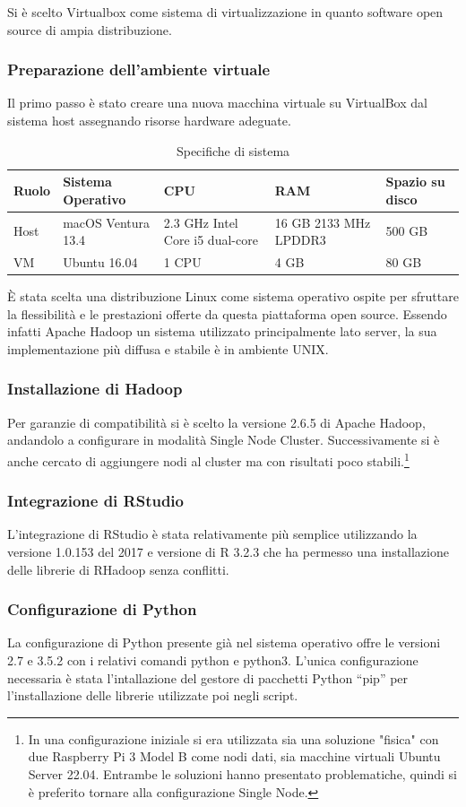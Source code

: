 Si è scelto Virtualbox come sistema di virtualizzazione in quanto software open source di ampia distribuzione.
\subsubsection{Preparazione dell'ambiente virtuale}
Il primo passo è stato creare una nuova macchina virtuale su VirtualBox dal sistema host assegnando risorse hardware adeguate.
\begin{table}[ht]
\centering
\begin{tabularx}{\textwidth}{|X|X|X|X|X|}
\hline
Ruolo & Sistema Operativo & CPU & RAM & Spazio su disco \\
\hline
Host & macOS Ventura 13.4 & 2.3 GHz Intel Core i5 dual-core & 16 GB 2133 MHz LPDDR3 & 500 GB \\
\hline
VM & Ubuntu 16.04 & 1 CPU & 4 GB & 80 GB \\
\hline
\end{tabularx}
\caption{Specifiche di sistema}
\label{tab:specifiche}
\end{table}
    
È stata scelta una distribuzione Linux come sistema operativo ospite per sfruttare la flessibilità e le prestazioni offerte da questa piattaforma open source. Essendo infatti Apache Hadoop un sistema utilizzato principalmente lato server, la sua implementazione più diffusa e stabile è in ambiente UNIX.
\subsubsection{Installazione di Hadoop}
Per garanzie di compatibilità si è scelto la versione 2.6.5 di Apache Hadoop, andandolo a configurare in modalità Single Node Cluster. Successivamente si è anche cercato di aggiungere nodi al cluster ma con risultati poco stabili.\footnote{In una configurazione iniziale si era utilizzata sia una soluzione "fisica" con due Raspberry Pi 3 Model B come nodi dati, sia macchine virtuali Ubuntu Server 22.04. Entrambe le soluzioni hanno presentato problematiche, quindi si è preferito tornare alla configurazione Single Node.}
\subsubsection{Integrazione di RStudio}
L'integrazione di RStudio è stata relativamente più semplice utilizzando la versione 1.0.153 del 2017 e versione di R 3.2.3 che ha permesso una installazione delle librerie di RHadoop senza conflitti.
\subsubsection{Configurazione di Python}
La configurazione di Python presente già nel sistema operativo offre le versioni 2.7 e 3.5.2 con i relativi comandi python e python3. L’unica configurazione necessaria è stata l’intallazione del gestore di pacchetti Python “pip” per l’installazione delle librerie utilizzate poi negli script.

